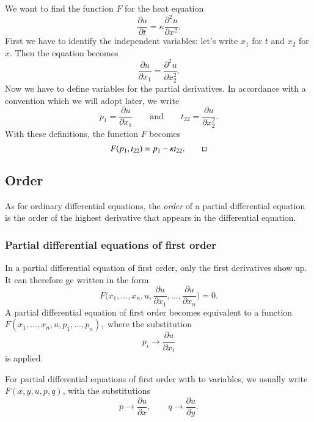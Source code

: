 \begin{beispiel}
We want to find the function $F$ for the heat equation
\[
\frac{\partial u}{\partial t}=\kappa\frac{\partial^2 u}{\partial x^2}.
\]
First we have to identify the independent variables: let's write 
$x_1$ for $t$ and $x_2$ for $x$.
Then the equation becomes
\[
\frac{\partial u}{\partial x_1}
=
\frac{\partial^2u}{\partial x_2^2}.
\]
Now we have to define variables for the partial derivatives.
In accordance with a convention which we will adopt later, we write
\[
p_1 = \frac{\partial u}{\partial x_1}
\qquad\text{and}\qquad
t_{22} = \frac{\partial u}{\partial x_2^2}.
\]
With these definitions, the function $F$ becomes
\[
F(p_1, t_{22})= p_1 - \kappa t_{22}.
\qedhere
\]
\end{beispiel}

\subsection{Order\label{klassifikation:ordnung}}
As for ordinary differential equations, the {\em order} of a partial
differential equation is the order of the
highest derivative that appears in the differential equation.

\subsubsection{Partial differential equations of first order}
In a partial differential equation of first order, only the first derivatives
show up.
It can therefore ge written in the form
\[
F\biggl(x_1,\dots,x_n, u, \frac{\partial u}{\partial x_1},\dots,\frac{\partial u}{\partial x_n}\biggr)=0.
\]
A partial differential equation of first order becomes equivalent to
a function
$F(x_1,\dots,x_n,u,p_1,\dots,p_n),$
where the substitution
\[
p_i\to \frac{\partial u}{\partial x_i}
\]
is applied.

For partial differential equations of first order with to variables,
we usually write
$F(x,y,u,p,q)$,
with the substitutions
\[
p\to\frac{\partial u}{\partial x},
\qquad
q\to\frac{\partial u}{\partial y}.
\]

